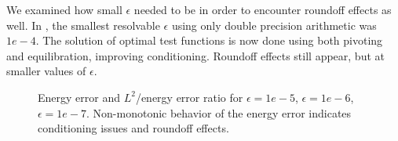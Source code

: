 \documentclass[11pt,onecolumn]{scrartcl}
\begin{document}
We examined how small $\epsilon$ needed to be in order to encounter roundoff effects as well. In \cite{DPGrobustness}, the smallest resolvable $\epsilon$ using only double precision arithmetic was $1e-4$. The solution of optimal test functions is now done using both pivoting and equilibration, improving conditioning. Roundoff effects still appear, but at smaller values of $\epsilon$.

\begin{figure}[h!]
\centering
{}
\caption{Energy error and $L^2$/energy error ratio for $\epsilon=1e-5$, $\epsilon=1e-6$, $\epsilon=1e-7$. Non-monotonic behavior of the energy error indicates conditioning issues and roundoff effects.}
\label{roundoff_figures}
\end{figure}
\end{document}
